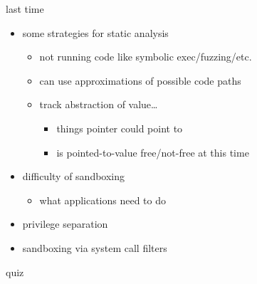 \date{}
\title{}
\date{}
\usepackage[outputdir=latex.out]{minted}

\begin{frame}
    \titlepage
\end{frame}



\begin{frame}{last time}
    \begin{itemize}
    \item some strategies for static analysis
        \begin{itemize}
        \item not running code like symbolic exec/fuzzing/etc.
        \item can use approximations of possible code paths
        \item track abstraction of value\ldots
            \begin{itemize}
            \item things pointer could point to
            \item is pointed-to-value free/not-free at this time
            \end{itemize}
        \end{itemize}
    \item difficulty of sandboxing
        \begin{itemize}
        \item what applications need to do
        \end{itemize}
    \item privilege separation
    \item sandboxing via system call filters
    \end{itemize}
\end{frame}

\begin{frame}{quiz}
\end{frame}

